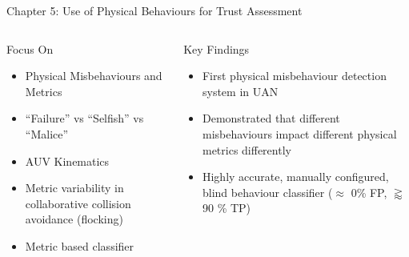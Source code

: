 \documentclass[aspectratio=169]{beamer}
\begin{document}
\begin{frame}{Chapter 5: Use of Physical Behaviours for Trust Assessment}
  \begin{columns}
    \begin{column}{0.5\textwidth}
      \begin{block}{Focus On}
        \begin{itemize}
          \item Physical Misbehaviours and Metrics
          \item ``Failure'' vs ``Selfish'' vs ``Malice''
          \item AUV Kinematics
          \item Metric variability in collaborative collision avoidance (flocking)
          \item Metric based classifier
        \end{itemize}
      \end{block}
    \end{column}
    \begin{column}{0.5\textwidth}
      \begin{exampleblock}{Key Findings}
        \begin{itemize}
        	\item First physical misbehaviour detection system in UAN
        	\item Demonstrated that different misbehaviours impact different physical metrics differently \hyperlink{fig:metric_values}{} \hyperlink{fig:summedsigmabar}{}
        	\item Highly accurate, manually configured, blind behaviour classifier ($\approx$ 0\% FP, $\gtrapprox$ 90 \% TP)
        \end{itemize}
      \end{exampleblock}
    \end{column}
  \end{columns}
\end{frame}
\end{document}

